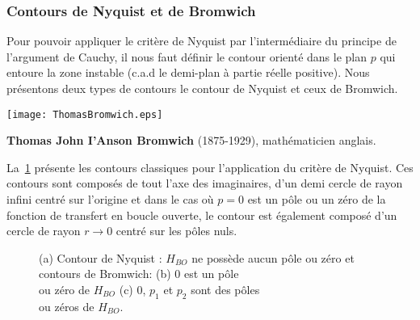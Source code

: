 \subsubsection{Contours de Nyquist et de Bromwich}
Pour pouvoir appliquer le critère de Nyquist par l'intermédiaire du principe 
de l'argument de Cauchy, il nous faut définir le contour orienté dans le plan 
$p$ qui entoure la zone instable (c.a.d le demi-plan à partie réelle positive).
Nous présentons deux types de contours le contour de Nyquist et ceux de 
Bromwich.
\begin{marginfigure}
    \centering
    \texttt{[image: ThomasBromwich.eps]} 
    \caption*{\textbf{Thomas John I'Anson Bromwich} 
             (1875-1929), mathématicien anglais.}
\end{marginfigure}
La~\cref{fig-contours} présente les contours classiques pour l'application 
du critère de Nyquist. Ces contours sont composés de tout l'axe des 
imaginaires, d'un demi cercle de rayon infini centré sur l'origine et dans le
cas où $p=0$ est un pôle ou un zéro de la fonction de transfert en boucle 
ouverte, le contour est également composé d'un cercle de rayon 
$r\rightarrow0$ centré sur les pôles nuls.

\begin{figure}[!h]
    \centering
    
    
    
    \caption{(a) Contour de Nyquist :  $H_{BO}$ ne possède aucun pôle ou zéro 
             et contours de Bromwich: (b) 0 est un pôle\\ ou zéro de $H_{BO}$
             (c) 0, $p_1$ et $p_2$ sont des pôles\\ ou zéros de $H_{BO}$.
             \label{fig-contours}} 
\end{figure}
